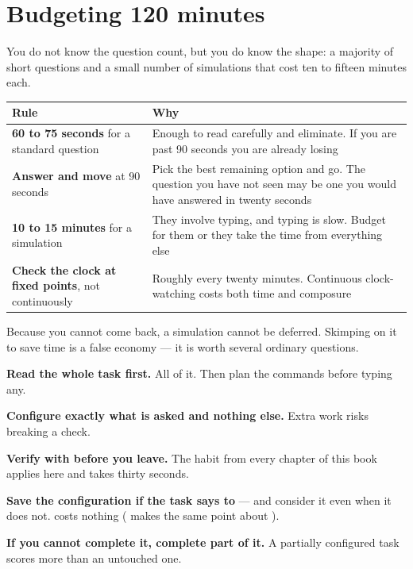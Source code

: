 \section{Budgeting 120 minutes}

You do not know the question count, but you do know the shape: a majority of
short questions and a small number of simulations that cost ten to fifteen
minutes each.

\begin{longtable}{@{}L{4.6cm}L{10.4cm}@{}}
\toprule
{}
\textbf{Rule} & \textbf{Why} \\
\midrule
\endhead
\textbf{60 to 75 seconds} for a standard question &
Enough to read carefully and eliminate. If you are past 90 seconds you are
already losing \\
\textbf{Answer and move} at 90 seconds &
Pick the best remaining option and go. The question you have not seen may be one
you would have answered in twenty seconds \\
\textbf{10 to 15 minutes} for a simulation &
They involve typing, and typing is slow. Budget for them or they take the time
from everything else \\
\textbf{Check the clock at fixed points}, not continuously &
Roughly every twenty minutes. Continuous clock-watching costs both time and
composure \\
\bottomrule
\end{longtable}

\begin{conceptbox}
Because you cannot come back, a simulation cannot be deferred. Skimping on it to
save time is a false economy --- it is worth several ordinary questions.

\begin{tight}
  \item \textbf{Read the whole task first.} All of it. Then plan the commands
        before typing any.
  \item \textbf{Configure exactly what is asked and nothing else.} Extra work
        risks breaking a check.
  \item \textbf{Verify with  before you leave.} The habit from every
        chapter of this book applies here and takes thirty seconds.
  \item \textbf{Save the configuration if the task says to} --- and consider it
        even when it does not.  costs
        nothing ( makes the same point about ).
  \item \textbf{If you cannot complete it, complete part of it.} A partially
        configured task scores more than an untouched one.
\end{tight}
\end{conceptbox}

